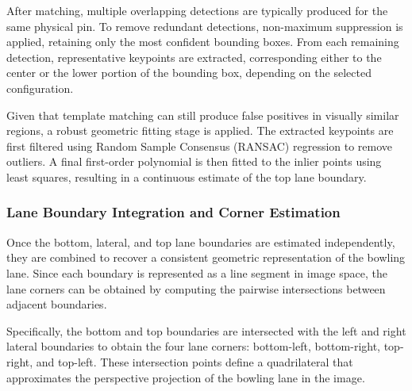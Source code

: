 After matching, multiple overlapping detections are typically produced for the same physical pin. To remove redundant detections, non-maximum suppression is applied, retaining only the most confident bounding boxes. From each remaining detection, representative keypoints are extracted, corresponding either to the center or the lower portion of the bounding box, depending on the selected configuration.

Given that template matching can still produce false positives in visually similar regions, a robust geometric fitting stage is applied. The extracted keypoints are first filtered using Random Sample Consensus (RANSAC)\cite{fischler1981ransac} regression to remove outliers. A final first-order polynomial is then fitted to the inlier points using least squares, resulting in a continuous estimate of the top lane boundary.

\subsubsection{Lane Boundary Integration and Corner Estimation}
Once the bottom, lateral, and top lane boundaries are estimated independently, they are combined to recover a consistent geometric representation of the bowling lane. Since each boundary is represented as a line segment in image space, the lane corners can be obtained by computing the pairwise intersections between adjacent boundaries.

Specifically, the bottom and top boundaries are intersected with the left and right lateral boundaries to obtain the four lane corners: bottom-left, bottom-right, top-right, and top-left. These intersection points define a quadrilateral that approximates the perspective projection of the bowling lane in the image.
